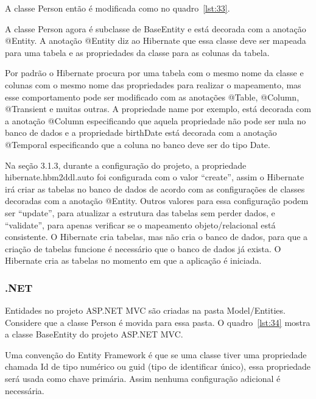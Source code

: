 \documentclass[a4paper,12pt]{article}
\newcommand{\javacode}[3] {
	
}
\begin{document}
A classe Person então é modificada como no quadro~\ref{lst:33}.

\javacode{code/33.txt}{Classe Person herda de BaseEntity}{lst:33}

A classe Person agora é subclasse de BaseEntity e está decorada com a anotação @Entity. A anotação @Entity diz ao Hibernate que essa classe deve ser mapeada para uma tabela e as propriedades da classe para as colunas da tabela.

Por padrão o Hibernate procura por uma tabela com o mesmo nome da classe e colunas com o mesmo nome das propriedades para realizar o mapeamento, mas esse comportamento pode ser modificado com as anotações @Table, @Column, @Transient e muitas outras. A propriedade name por exemplo, está decorada com a anotação @Column especificando que aquela propriedade não pode ser nula no banco de dados e a propriedade birthDate está decorada com a anotação @Temporal especificando que a coluna no banco deve ser do tipo Date.

Na seção 3.1.3, durante a configuração do projeto, a propriedade hibernate.hbm2ddl.auto foi configurada com o valor “create”, assim o Hibernate irá criar as tabelas no banco de dados de acordo com as configurações de classes decoradas com a anotação @Entity. Outros valores para essa configuração podem ser “update”, para atualizar a estrutura das tabelas sem perder dados, e “validate”, para apenas verificar se o mapeamento objeto/relacional está consistente. O Hibernate cria tabelas, mas não cria o banco de dados, para que a criação de tabelas funcione é necessário que o banco de dados já exista. O Hibernate cria as tabelas no momento em que a aplicação é iniciada.

\subsubsection{.NET}

Entidades no projeto ASP.NET MVC são criadas na pasta Model/Entities. Considere que a classe Person é movida para essa pasta. O quadro~\ref{lst:34} mostra a classe BaseEntity do projeto ASP.NET MVC.

\javacode{code/34.txt}{Classe BaseEntity no projeto ASP.NET}{lst:34}

Uma convenção do Entity Framework é que se uma classe tiver uma propriedade chamada Id de tipo numérico ou guid (tipo de identificar único), essa propriedade será usada como chave primária. Assim nenhuma configuração adicional é necessária.
\end{document}
